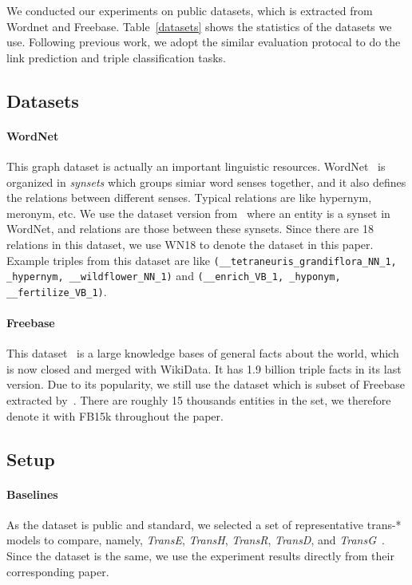 \documentclass[twocolumn,a4paper,10pt,preprint,3p]{elsarticle}
\begin{document}
We conducted our experiments on public datasets, which is extracted from Wordnet and Freebase. Table~\ref{datasets} shows the statistics of the datasets we use. Following previous work, we adopt the similar evaluation protocal to do the link prediction and triple classification tasks.


\subsection{Datasets}

\paragraph{WordNet} This graph dataset is actually an important linguistic resources. WordNet~\cite{miller1995wordnet} is organized in \emph{synsets} which groups simiar word senses together, and it also defines the relations between different senses. Typical relations are like hypernym, meronym, etc. We use the dataset version from~\cite{bordes2014SME} where an entity is a synset in WordNet, and relations are those between these synsets. Since there are 18 relations in this dataset, we use WN18 to denote the dataset in this paper. Example triples from this dataset are like \texttt{({\_}{\_}tetraneuris{\_}grandiflora{\_}NN{\_}1, {\_}hypernym, {\_}{\_}wildflower{\_}NN{\_}1)} and \texttt{({\_}{\_}enrich{\_}VB{\_}1, {\_}hyponym, {\_}{\_}fertilize{\_}VB{\_}1)}.

\paragraph{Freebase} This dataset~\cite{bollacker2008freebase} is a large knowledge bases of general facts about the world, which is now closed and merged with WikiData. It has 1.9 billion triple facts in its last version. Due to its popularity, we still use the dataset which is subset of Freebase extracted by~\cite{TransE2013}. There are roughly 15 thousands entities in the set, we therefore denote it with FB15k throughout the paper.


\subsection{Setup}

\paragraph{Baselines} As the dataset is public and standard, we selected a set of representative trans-* models to compare, namely, \emph{TransE}, \emph{TransH}, \emph{TransR}, \emph{TransD}, and \emph{TransG}~\cite{TransE2013,TransH2014,TransR2015,TransD,TransG}. Since the dataset is the same, we use the experiment results directly from their corresponding paper. 
\end{document}
